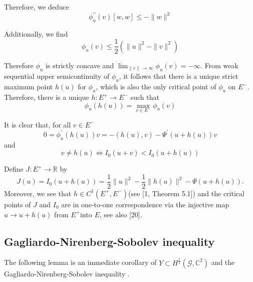 \documentclass[11pt]{amsart}
\newtheorem{lemma}[theorem]{Lemma}
\newcommand{\red}[1]{\textcolor{red}{#1}}
\newcommand{\G}{\mathcal{G}}
\numberwithin{equation}{section}
\begin{document}
Therefore, we deduce
$$
\phi_{u}^{\prime \prime}(v)[w, w] \leq-\|w\|^{2}
$$

Additionally, we find
$$
\phi_{u}(v) \leq \frac{1}{2}\left(\|u\|^{2}-\|v\|^{2}\right)
$$

Therefore $\phi_{u}$ is strictly concave and $\lim _{\|v\| \rightarrow \infty} \phi_{u}(v)=-\infty$. From weak sequential upper semicontinuity of $\phi_{u}$, it follows that there is a unique strict maximum point $h(u)$ for $\phi_{u}$, which is also the only critical point of $\phi_{u}$ on $E^{-}$.
Therefore, there is a unique $h: E^{+} \rightarrow E^{-}$ such that
$$
\phi_{u}(h(u))=\max _{v \in E^{-}} \phi_{u}(v)
$$

It is clear that, for all $v \in E^{-}$
$$
0=\phi_{u}^{\prime}(h(u)) v=-(h(u), v)-\Psi^{\prime}(u+h(u)) v
$$
and
$$
v \neq h(u) \Leftrightarrow I_{0}(u+v)<I_{0}(u+h(u))
$$

Define $J: E^{+} \rightarrow \mathbb{R}$ by
\begin{equation*}
J(u)=I_{0}(u+h(u))=\frac{1}{2}\|u\|^{2}-\frac{1}{2}\|h(u)\|^{2}-\Psi(u+h(u)) . \tag{2.3}
\end{equation*}
Moreover, we see that $h \in C^{1}\left(E^{+}, E^{-}\right)$(see [1, Theorem 5.1]) and the critical points of $J$ and $I_{0}$ are in one-to-one correspondence via the injective map $u \rightarrow u+h(u)$ from $E^{+}$into $E$, see also [20].
\fi
\subsection{Gagliardo-Nirenberg-Sobolev inequality}
The following lemma is an immediate corollary of $Y \subset H^{\frac{1}{2}}(\G,\mathbb{C}^2)$ and the Gagliardo-Nirenberg-Sobolev inequality \cite[Theorem 1.1]{Ha2}.

\end{document}
